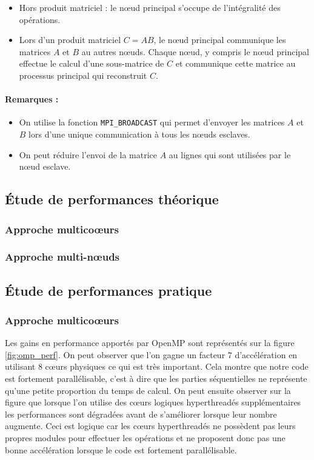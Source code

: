\documentclass[11pt,a4paper]{article}
\begin{document}
		\begin{itemize}
			\item Hors produit matriciel : le n\oe{}ud principal s'occupe de l'intégralité des opérations.
			\item Lors d'un produit matriciel $C = AB$, le n\oe{}ud principal communique les matrices $A$ et $B$ au autres n\oe{}uds. Chaque n\oe{}ud, y compris le n\oe{}ud principal effectue le calcul d'une sous-matrice de $C$ et communique cette matrice au processus principal qui reconstruit $C$.
		\end{itemize}

		\paragraph{Remarques :}
		\begin{itemize}
			\item On utilise la fonction \texttt{MPI\_BROADCAST} qui permet d'envoyer les matrices $A$ et $B$ lors d'une unique communication à tous les n\oe{}uds esclaves.
			\item On peut réduire l'envoi de la matrice $A$ au lignes qui sont utilisées par le n\oe{}ud esclave.
		\end{itemize}

	\subsection{Étude de performances théorique}

		\subsubsection{Approche multico\oe{}urs}

		\subsubsection{Approche multi-n\oe{}uds}

	\subsection{Étude de performances pratique}

		\subsubsection{Approche multico\oe{}urs}
		
			Les gains en performance apportés par OpenMP sont représentés sur la figure \ref{fig:omp_perf}. On peut observer que l'on gagne un facteur 7 d'accélération en utilisant 8 cœurs physiques ce qui est très important. Cela montre que notre code est fortement parallélisable, c'est à dire que les parties séquentielles ne représente qu'une petite proportion du temps de calcul. On peut ensuite observer sur la figure que lorsque l'on utilise des cœurs logiques hyperthreadés supplémentaires les performances sont dégradées avant de s'améliorer lorsque leur nombre augmente. Ceci est logique car les cœurs hyperthreadés ne possèdent pas leurs propres modules pour effectuer les opérations et ne proposent donc pas une bonne accélération lorsque le code est fortement parallélisable.
\end{document}
